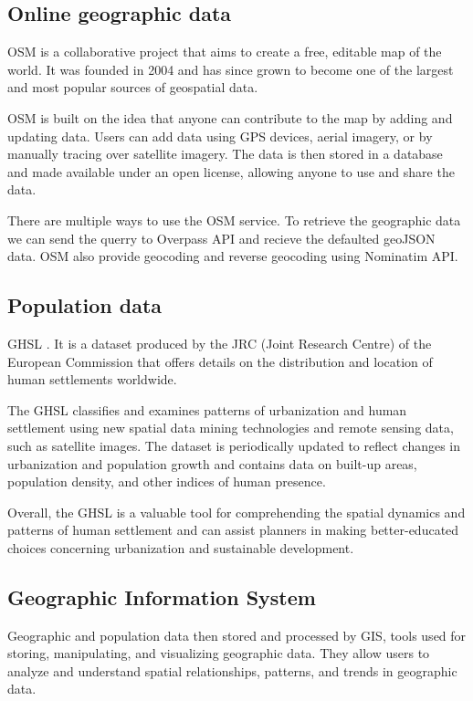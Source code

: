 \documentclass[12pt]{report}
\begin{document}
        \subsection{Online geographic data}
            OSM \cite{noauthor_openstreetmap_2022} is a collaborative project that aims to create a free, editable map of the world. It was founded in
            2004 and has since grown to become one of the largest and most popular sources of geospatial data.

            OSM is built on the idea that anyone can contribute to the map by adding and updating data. Users can add
            data using \ac{GPS} devices, aerial imagery, or by manually tracing over satellite imagery. The data is then
            stored in a database and made available under an open license, allowing anyone to use and share the data.

            There are multiple ways to use the OSM service. To retrieve the geographic data we can send the querry to
            Overpass \ac{API} and recieve the defaulted \ac{geoJSON} data. OSM also provide geocoding and reverse geocoding using
            Nominatim API.

        \subsection{Population data}
            GHSL \cite{noauthor_global_2023}. It is a dataset produced by the JRC (Joint Research Centre) of the European Commission that
            offers details on the distribution and location of human settlements worldwide.

            The GHSL classifies and examines patterns of urbanization and human settlement using new spatial data mining
            technologies and remote sensing data, such as satellite images. The dataset is periodically updated to
            reflect changes in urbanization and population growth and contains data on built-up areas, population
            density, and other indices of human presence.

            Overall, the GHSL is a valuable tool for comprehending the spatial dynamics and patterns of human settlement
            and can assist planners in making better-educated choices concerning urbanization and sustainable
            development.

        \subsection{Geographic Information System}
            Geographic and population data then stored and processed by \ac{GIS}, tools used
            for storing, manipulating, and visualizing geographic data. They allow users to analyze and understand spatial
            relationships, patterns, and trends in geographic data. 
            
\end{document}
